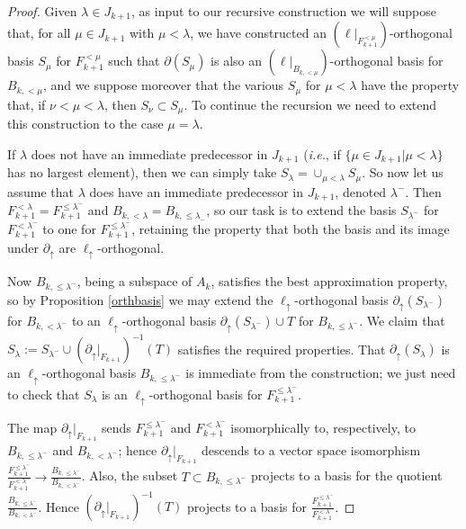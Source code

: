 \documentclass[11pt]{amsart}
\theoremstyle{definition}
\theoremstyle{remark}
\numberwithin{equation}{section}
\begin{document}
\begin{proof}
	Given $\lambda\in J_{k+1}$, as input to our recursive construction we will suppose that, for all $\mu\in J_{k+1}$ with $\mu<\lambda$, we have constructed an $(\ell|_{F_{k+1}^{< \mu}})$-orthogonal basis $S_{\mu}$ for $F_{k+1}^{< \mu}$ such that $\partial(S_{\mu})$ is also an $(\ell|_{B_{k,<\mu}})$-orthogonal basis for $B_{k,<\mu}$, and we suppose moreover that the various $S_{\mu}$ for $\mu<\lambda$ have the property that, if $\nu<\mu<\lambda$, then $S_{\nu}\subset S_{\mu}$.  To continue the recursion we need to extend this construction to the case $\mu=\lambda$.
	
	If $\lambda$ does not have an immediate predecessor in $J_{k+1}$ (\emph{i.e.}, if $\{\mu\in J_{k+1}|\mu<\lambda\}$ has no largest element), then we can simply take $S_{\lambda}=\cup_{\mu<\lambda}S_{\mu}$.  So now let us assume that $\lambda$ does have an immediate predecessor in $J_{k+1}$, denoted $\lambda^-$.  Then $F_{k+1}^{<\lambda}=F_{k+1}^{\leq \lambda^-}$ and $B_{k,<\lambda}=B_{k,\leq \lambda_-}$, so our task is to extend the basis $S_{\lambda^-}$ for $F_{k+1}^{<\lambda^-}$ to one for $F_{k+1}^{\leq \lambda^-}$, retaining the property that both the basis and its image under $\partial_{\uparrow}$ are $\ell_{\uparrow}$-orthogonal.
	
	Now $B_{k,\leq\lambda^-}$, being a subspace of $A_k$, satisfies the best approximation property, so by Proposition \ref{orthbasis} we may extend the $\ell_{\uparrow}$-orthogonal basis $\partial_{\uparrow}(S_{\lambda^-})$ for $B_{k,<\lambda^-}$ to an $\ell_{\uparrow}$-orthogonal basis $\partial_{\uparrow}(S_{\lambda^-})\cup T$ for $B_{k,\leq \lambda^-}$.  We claim that $S_{\lambda}:=S_{\lambda^-}\cup (\partial_{\uparrow}|_{F_{k+1}})^{-1}(T)$ satisfies the required properties.  That $\partial_{\uparrow}(S_{\lambda})$ is an $\ell_{\uparrow}$-orthogonal basis $B_{k,\leq\lambda^-}$ is immediate from the construction; we just need to check that $S_{\lambda}$ is an $\ell_{\uparrow}$-orthogonal basis for $F_{k+1}^{\leq\lambda^-}$.  
	
	The map $\partial_{\uparrow}|_{F_{k+1}}$ sends $F_{k+1}^{\leq\lambda^-}$ and $F_{k+1}^{<\lambda^-}$ isomorphically to, respectively, to $B_{k,\leq\lambda^-}$ and $B_{k,<\lambda^-}$; hence $\partial_{\uparrow}|_{F_{k+1}}$ descends to a vector space isomorphism $\frac{F_{k+1}^{\leq\lambda^-}}{F_{k+1}^{<\lambda^-}}\to \frac{B_{k,\leq\lambda^-}}{B_{k,<\lambda^-}}$.  Also, the subset $T\subset B_{k,\leq \lambda^-}$ projects to a basis for the quotient $\frac{B_{k,\leq\lambda^-}}{B_{k,<\lambda^-}}$.  Hence $(\partial_{\uparrow}|_{F_{k+1}})^{-1}(T)$ projects to a basis for $\frac{F_{k+1}^{\leq\lambda^-}}{F_{k+1}^{<\lambda^-}}$.  
	

\end{proof}
\end{document}
